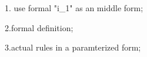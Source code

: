 1. use formal "i_1" as an middle form;

2.formal definition;

3.actual rules in a paramterized form;



